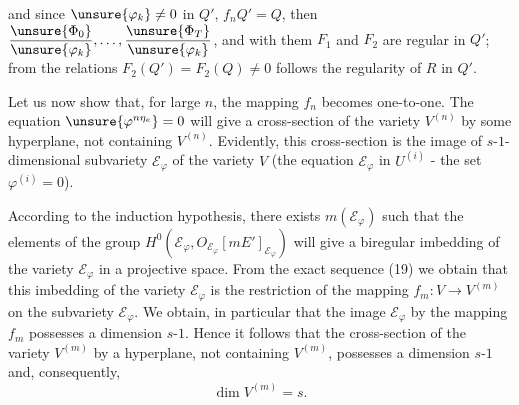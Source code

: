 and since $\unsure{\varphi_k}\ne0$ in $Q'$, $f_nQ'=Q$, then $\dfrac{\unsure{\Phi_0}}{\unsure{\varphi_k}},\ldots,\dfrac{\unsure{\Phi_T}}{\unsure{\varphi_k}}$, and with them $F_1$ and $F_2$ are regular in $Q'$; from the relations $F_2(Q')=F_2(Q)\ne0$ follows the regularity of $R$ in $Q'$.

Let us now show that, for large $n$, the mapping $f_n$ becomes one-to-one. The equation $\unsure{\varphi^{n\eta_e}}=0$ will give a cross-section of the variety $V^{(n)}$ by some hyperplane, not containing $V^{(n)}$. Evidently, this cross-section is the image of $s$-$1$-dimensional subvariety $\mathcal E_\varphi$ of the variety $V$ (the equation $\mathcal E_\varphi$ in $U^{(i)}$ - the set $\varphi^{(i)}=0$).

According to the induction hypothesis, there exists $m(\mathcal E_\varphi)$ such that the elements of the group  $H^0(\mathcal E_\varphi,O_{\mathcal E_\varphi}[mE']_{\mathcal E_\varphi})$ will give a biregular imbedding of the variety $\mathcal E_\varphi$ in a projective space. From the exact sequence (19) we obtain that this imbedding of the variety $\mathcal E_\varphi$ is the restriction of the mapping $f_m:V\to V^{(m)}$ on the subvariety $\mathcal E_\varphi$. We obtain, in particular that the image $\mathcal E_\varphi$ by the mapping $f_m$ possesses a dimension $s$-$1$. Hence it follows that the cross-section of the variety $V^{(m)}$ by a hyperplane, not containing $V^{(m)}$, possesses a dimension $s$-$1$ and, consequently,
\[
\dim V^{(m)}=s.
\]
